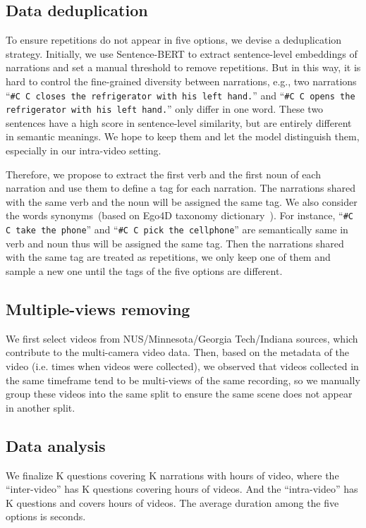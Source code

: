 \documentclass{article}
\begin{document}
\subsection{Data deduplication}\label{b1}
To ensure repetitions do not appear in five options, we devise a deduplication strategy.
Initially, we use Sentence-BERT to extract sentence-level embeddings of narrations and set a manual threshold to remove repetitions.
But in this way, it is hard to control the fine-grained diversity between narrations, e.g., two narrations 
``\texttt{\#C C closes the refrigerator with his left hand.}'' and ``\texttt{\#C C opens the refrigerator with his left hand.}'' only differ in one word. These two sentences have a high score in sentence-level similarity, but are entirely different in semantic meanings. We hope to keep them and let the model distinguish them, especially in our intra-video setting.

Therefore, we propose to extract \textcolor{citecolor1}{the first verb} and \textcolor{citecolor2}{the first noun} of each narration and use them to define a tag for each narration.
The narrations shared with the same verb and the noun will be assigned the same tag. 
We also consider the words synonyms~(based on Ego4D taxonomy dictionary~\cite{grauman2021ego4d}).
For instance, ``\texttt{\#C C \textcolor{citecolor1}{take} the \textcolor{citecolor2}{phone}}'' and ``\texttt{\#C C \textcolor{citecolor1}{pick} the \textcolor{citecolor2}{cellphone}}'' are semantically same in verb and noun thus will be assigned the same tag. 
Then the narrations shared with the same tag are treated as repetitions, we only keep one of them and sample a new one until the tags of the five options are different.

\subsection{Multiple-views removing}\label{b3}
We first select videos from NUS/Minnesota/Georgia Tech/Indiana sources, which contribute to the multi-camera video data. Then, based on the metadata of the video (i.e. times when videos were collected), we observed that videos collected in the same timeframe tend to be multi-views of the same recording, so we manually group these videos into the same split to ensure the same scene does not appear in another split.

\subsection{Data analysis}\label{b2}
We finalize K questions covering K narrations with  hours of video, where the ``inter-video'' has K questions covering  hours of videos. And the ``intra-video'' has K questions and covers  hours of videos. The average duration among the five options is  seconds.
\end{document}
